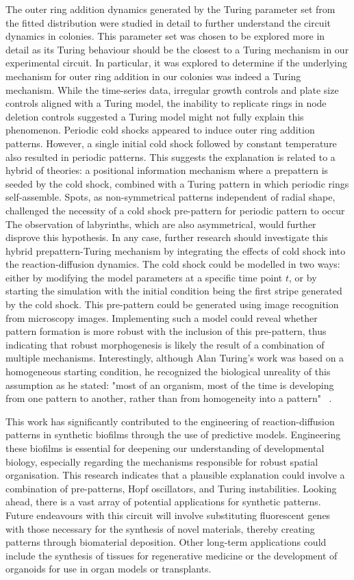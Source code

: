 The outer ring addition dynamics generated by the Turing parameter set from the fitted distribution were studied in detail to further understand the circuit dynamics in colonies.
This parameter set was chosen to be explored more in detail as its Turing behaviour should be the closest to a Turing mechanism in our experimental circuit.
In particular, it was explored to determine if the underlying mechanism for outer ring addition in our colonies was indeed a Turing mechanism.
While the time-series data, irregular growth controls and plate size controls aligned with a Turing model, the inability to replicate rings in node deletion controls suggested a Turing model might not fully explain this phenomenon.
Periodic cold shocks appeared to induce outer ring addition patterns.
However, a single initial cold shock followed by constant temperature also resulted in periodic patterns.
This suggests the explanation is related to a hybrid of theories: a positional information mechanism where a prepattern is seeded by the cold shock, combined with a Turing pattern in which periodic rings self-assemble.
Spots, as non-symmetrical patterns independent of radial shape, challenged the necessity of a cold shock pre-pattern for periodic pattern to occur
The observation of labyrinths, which are also asymmetrical, would further disprove this hypothesis.
In any case, further research should investigate this hybrid prepattern-Turing mechanism by integrating the effects of cold shock into the reaction-diffusion dynamics.
The cold shock could be modelled in two ways: either by modifying the model parameters at a specific time point $t$, or by starting the simulation with the initial condition being the first stripe generated by the cold shock.
This pre-pattern could be generated using image recognition from microscopy images.
Implementing such a model could reveal whether pattern formation is more robust with the inclusion of this pre-pattern, thus indicating that robust morphogenesis is likely the result of a combination of multiple mechanisms.
Interestingly, although Alan Turing's work was based on a homogeneous starting condition, he recognized the biological unreality of this assumption as he stated: "most of an organism, most of the time is developing from one pattern to another, rather than from homogeneity into a pattern" ~\parencite{Turing1952}.


This work has significantly contributed to the engineering of reaction-diffusion patterns in synthetic biofilms through the use of predictive models.
Engineering these biofilms is essential for deepening our understanding of developmental biology, especially regarding the mechanisms responsible for robust spatial organisation.
This research indicates that a plausible explanation could involve a combination of pre-patterns, Hopf oscillators, and Turing instabilities.
Looking ahead, there is a vast array of potential applications for synthetic patterns.
Future endeavours with this circuit will involve substituting fluorescent genes with those necessary for the synthesis of novel materials, thereby creating patterns through biomaterial deposition.
Other long-term applications could include the synthesis of tissues for regenerative medicine or the development of organoids for use in organ models or transplants.
